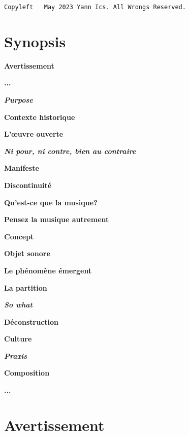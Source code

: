 \documentclass{article}
\begin{document}
\vspace*{\fill}
\begin{center} 
 \texttt{Copyleft \textcopyleft \, May 2023 Yann Ics. All Wrongs Reserved.}
 \end{center} 

\newpage

\section*{Synopsis}

\bigskip

\textbf{Avertissement} \dotfill \pageref{avertissement}

\textbf{...} \dotfill \pageref{one}

\textbf{\textsl{Purpose}} \dotfill \pageref{purpose}

\textbf{Contexte historique} \dotfill \pageref{histoire}

\textbf{L'œuvre ouverte} \dotfill \pageref{oo}

\textbf{\textit{Ni pour, ni contre, bien au contraire}} \dotfill 
\pageref{nini}

\qquad \textbf{Manifeste} \hfill \pageref{manifeste}

\qquad \textbf{Discontinuité} \hfill \pageref{discontinu}

\textbf{Qu’est-ce que la musique?} \dotfill \pageref{musique}

\textbf{Pensez la musique autrement} \dotfill \pageref{think}

\qquad \textbf{Concept} \hfill \pageref{concept}

\textbf{Objet sonore} \dotfill \pageref{os}

\qquad \textbf{Le phénomène émergent} \hfill \pageref{emergent}

\qquad \textbf{La partition} \hfill \pageref{score}

\textbf{\textsl{So what}} \dotfill \pageref{sowhat}

\qquad \textbf{Déconstruction} \hfill \pageref{deconstruction}

\qquad \textbf{Culture} \hfill \pageref{culture}

\qquad \textbf{\textit{Praxis}} \hfill \pageref{praxis}

\qquad \textbf{Composition} \hfill \pageref{composition}

\textbf{...} \dotfill \pageref{two}

\newpage

\section*{Avertissement}
\label{avertissement}
\end{document}
